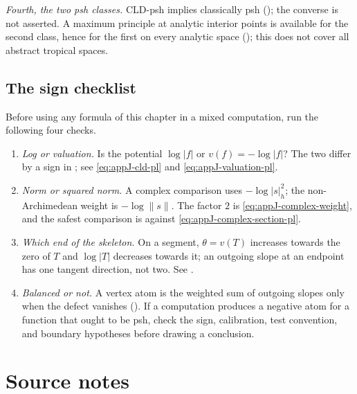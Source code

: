 \emph{Fourth, the two psh classes.}  CLD-psh implies classically psh
(); the converse is not asserted.  A maximum
principle at analytic interior points is available for the second class,
hence for the first on every analytic space
(); this does not cover all abstract tropical
spaces.

\subsection{The sign checklist}

Before using any formula of this chapter in a mixed computation, run the
following four checks.

\begin{enumerate}
\item \emph{Log or valuation.}  Is the potential $\log|f|$ or
  $v(f)=-\log|f|$?  The two differ by a sign in
  ; see \eqref{eq:appJ-cld-pl} and
  \eqref{eq:appJ-valuation-pl}.
\item \emph{Norm or squared norm.}  A complex comparison uses
  $-\log|s|_h^2$; the non-Archimedean weight is $-\log\|s\|$.  The factor $2$
  is \eqref{eq:appJ-complex-weight}, and the safest comparison is
   against
  \eqref{eq:appJ-complex-section-pl}.
\item \emph{Which end of the skeleton.}  On a segment, $\theta=v(T)$
  increases towards the zero of $T$ and $\log|T|$ decreases towards it; an
  outgoing slope at an endpoint has one tangent direction, not two.  See
  .
\item \emph{Balanced or not.}  A vertex atom is the weighted sum of outgoing
  slopes only when the defect vanishes
  ().  If a computation produces a negative atom
  for a function that ought to be psh, check the sign, calibration, test
  convention, and boundary hypotheses before drawing a conclusion.
\end{enumerate}

\section*{Source notes}

